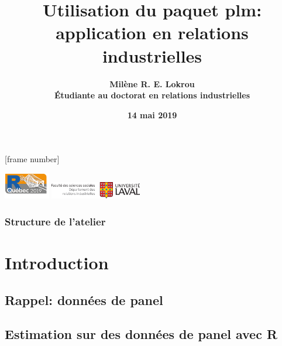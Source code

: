 \documentclass{beamer}
\title{\textbf{Utilisation du paquet plm: application en relations industrielles}}
\author{\textbf{Mil\`ene R. E. Lokrou \\ \'Etudiante au doctorat en relations industrielles}}
\institute{\textbf{Universit\'e Laval}}
\date{\textbf{14 mai 2019}}
\begin{document}
[frame number]
\begin{frame}
\titlepage
	\includegraphics[width=2cm]{RQC.png}\hfill
	\includegraphics[width=4cm]{UL2.jpg}
\end{frame}
\begin{frame}
\frametitle{\textbf{Structure de l'atelier}}
\tableofcontents
\end{frame}
\section{\textbf{Introduction}}
\subsection{Rappel: donn\'ees de panel}
\subsection{Estimation sur des donn\'ees de panel avec R}
\end{document}
